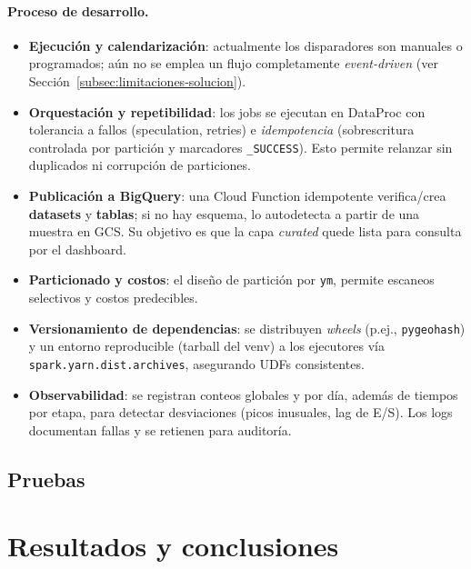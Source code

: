 \documentclass[10pt]{article}
\begin{document}
\paragraph{Proceso de desarrollo.}
\begin{itemize}
  \item \textbf{Ejecución y calendarización}: actualmente los disparadores son manuales o programados; aún no se emplea un flujo completamente \emph{event-driven} (ver Sección~\ref{subsec:limitaciones-solucion}). 
  \item \textbf{Orquestación y repetibilidad}: los jobs se ejecutan en DataProc con tolerancia a fallos (speculation, retries) e \emph{idempotencia} (sobrescritura controlada por partición y marcadores \texttt{\_SUCCESS}). Esto permite relanzar sin duplicados ni corrupción de particiones.
  \item \textbf{Publicación a BigQuery}: una Cloud Function idempotente verifica/crea \textbf{datasets} y \textbf{tablas}; si no hay esquema, lo autodetecta a partir de una muestra en GCS. Su objetivo es que la capa \textit{curated} quede lista para consulta por el dashboard.
  \item \textbf{Particionado y costos}: el diseño de partición por \texttt{ym}, permite escaneos selectivos y costos predecibles.
  \item \textbf{Versionamiento de dependencias}: se distribuyen \textit{wheels} (p.ej., \texttt{pygeohash}) y un entorno reproducible (tarball del venv) a los ejecutores vía \texttt{spark.yarn.dist.archives}, asegurando UDFs consistentes.
  \item \textbf{Observabilidad}: se registran conteos globales y por día, además de tiempos por etapa, para detectar desviaciones (picos inusuales, lag de E/S). Los logs documentan fallas y se retienen para auditoría.
\end{itemize}
\subsection{Pruebas} %
\section{Resultados y conclusiones} %
\end{document}
